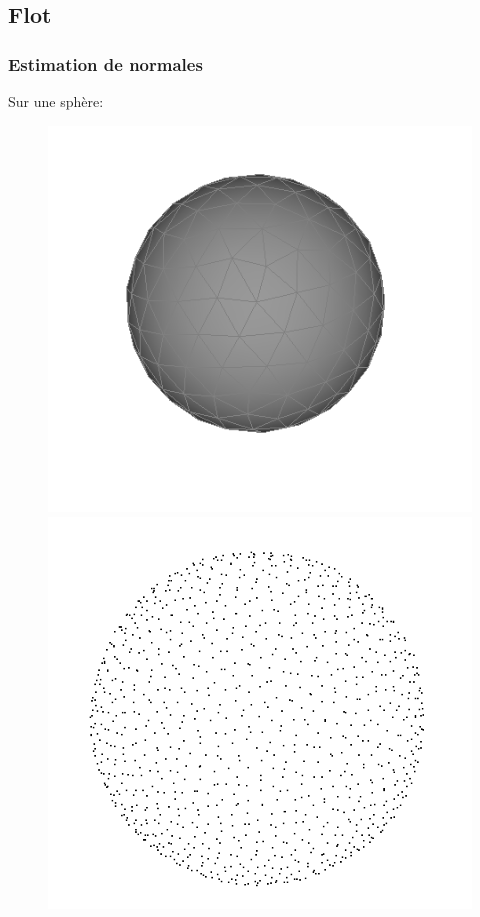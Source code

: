 \documentclass{beamer}
\begin{document}
\subsection{Flot}
\begin{frame}
    \frametitle{Estimation de normales}

    Sur une sphère:
    \begin{figure}
        \centering
        \includegraphics[scale=0.22]{img/sphere-polyhedron-200}
        \includegraphics[scale=0.2]{img/sphere-1000}

\end{figure}
\end{frame}
\end{document}
